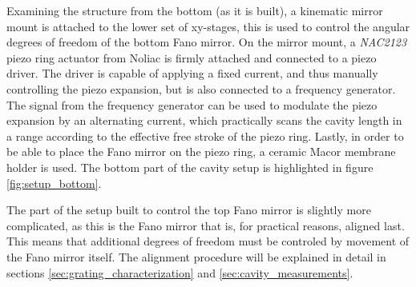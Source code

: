 Examining the structure from the bottom (as it is built), a kinematic mirror mount is attached to the lower set of xy-stages, this is used to control the angular degrees of freedom of the bottom Fano mirror. On the mirror mount, a \emph{NAC2123} piezo ring actuator from Noliac\cite{piezo_actuator} is firmly attached and connected to a piezo driver. The driver is capable of applying a fixed current, and thus manually controlling the piezo expansion, but is also connected to a frequency generator. The signal from the frequency generator can be used to modulate the piezo expansion by an alternating current, which practically scans the cavity length in a range according to the effective free stroke of the piezo ring. Lastly, in order to be able to place the Fano mirror on the  piezo ring, a ceramic Macor membrane holder is used. The bottom part of the cavity setup is highlighted in figure \ref{fig:setup_bottom}.

The part of the setup built to control the top Fano mirror is slightly more complicated, as this is the Fano mirror that is, for practical reasons, aligned last. This means that additional degrees of freedom must be controled by movement of the Fano mirror itself. The alignment procedure will be explained in detail in sections \ref{sec:grating_characterization} and \ref{sec:cavity_measurements}.

